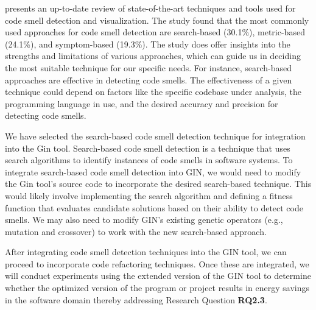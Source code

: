 \vspace{.5em}
\cite{DBLP:journals/corr/abs-2012-08842} presents an up-to-date review of state-of-the-art techniques and tools used for code smell detection and visualization. The study found that the most commonly used approaches for code smell detection are search-based (30.1\%), metric-based (24.1\%), and symptom-based (19.3\%). The study does offer insights into the strengths and limitations of various approaches, which can guide us in deciding the most suitable technique for our specific needs. For instance, search-based approaches are effective in detecting code smells. The effectiveness of a given technique could depend on factors like the specific codebase under analysis, the programming language in use, and the desired accuracy and precision for detecting code smells.

\vspace{.5em}
We have selected the search-based code smell detection technique for integration into the Gin tool. Search-based code smell detection is a technique that uses search algorithms to identify instances of code smells in software systems. To integrate search-based code smell detection into GIN, we would need to modify the Gin tool’s source code to incorporate the desired search-based technique. This would likely involve implementing the search algorithm and defining a fitness function that evaluates candidate solutions based on their ability to detect code smells. We may also need to modify GIN’s existing genetic operators (e.g., mutation and crossover) to work with the new search-based approach.

\vspace{.5em}
After integrating code smell detection techniques into the GIN tool, we can proceed to incorporate code refactoring techniques. Once these are integrated, we will conduct experiments using the extended version of the GIN tool to determine whether the optimized version of the program or project results in energy savings in the software domain thereby addressing Research Question \textbf{RQ2.3}.